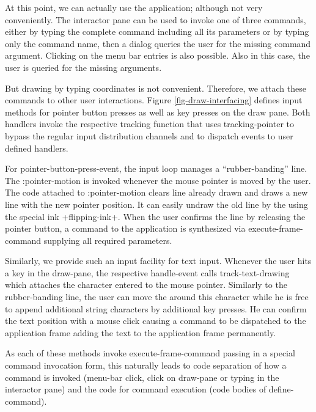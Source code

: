 \documentclass[twocolumn,a4paper]{article}
\newcommand {\code}[1]{{\sffamily #1}}
\let\class\code
\let\method\code
\let\constant\code
\let\macro\code
\let\keyword\code
\begin{document}
At this point, we can actually use the application; although not very
conveniently. The interactor pane can be used to invoke one of three
commands, either by typing the complete command including all its
parameters or by typing only the command name, then a dialog queries
the user for the missing command argument. Clicking on the menu bar
entries is also possible. Also in this case, the user is queried for
the missing arguments.

But drawing by typing coordinates is not convenient. Therefore, we
attach these commands to other user interactions.  Figure
\ref{fig-draw-interfacing} defines input methods for pointer button
presses as well as key presses on the draw pane. Both handlers invoke
the respective tracking function that uses \macro{tracking-pointer} to
bypass the regular input distribution channels and to dispatch events
to user defined handlers.

For \class{pointer-button-press-event}, the input loop manages a
``rubber-banding'' line. The \keyword{:pointer-motion} is invoked
whenever the mouse pointer is moved by the user. The code attached to
\keyword{:pointer-motion} clears line already drawn and draws a new
line with the new pointer position. It can easily undraw the old line
by the using the special ink \constant{+flipping-ink+}. When the user
confirms the line by releasing the pointer button, a command to the
application is synthesized via \method{execute-frame-command}
supplying all required parameters.

Similarly, we provide such an input facility for text input. Whenever
the user hits a key in the draw-pane, the respective
\method{handle-event} calls \method{track-text-drawing} which attaches
the character entered to the mouse pointer. Similarly to the
rubber-banding line, the user can move the around this character while
he is free to append additional string characters by additional key
presses. He can confirm the text position with a mouse click causing a
command to be dispatched to the application frame adding the text to
the application frame permanently.

As each of these methods invoke \code{execute-frame-command} passing
in a special command invocation form, this naturally leads to code
separation of how a command is invoked (menu-bar click, click on
draw-pane or typing in the interactor pane) and the code for command
execution (code bodies of \method{define-command}).
\end{document}
